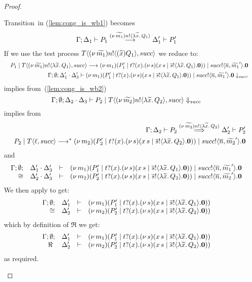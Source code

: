 \begin{proof}
\begin{enumerate}
\begin{enumerate}[i.]
						\noi Transition~in (\ref{lem:cong_is_wb1}) becomes
						\begin{eqnarray}
							\Gamma; \Delta_1 \vdash P_1 \stackrel{(\nu\, \widetilde{m_1}) n ! \langle \lambda \widetilde{x}.\,Q_1 \rangle}{\longrightarrow} \Delta_1' \vdash P_1'
							\label{lem:cong_is_wb3}
						\end{eqnarray}
						\noi If we use the test process $T\langle (\nu\, \widetilde{m_1}) n ! \langle (\widetilde{x}) Q_1 \rangle, succ \rangle$ we reduce to:%
						\begin{eqnarray*}
							&& P_1 \;|\; T\langle (\nu\, \widetilde{m_1}) n ! \langle \lambda \widetilde{x}.\,Q_1 \rangle, succ \rangle
							\longrightarrow
							(\nu\, m_1)(P_1' \;|\; t ? (x) . (\nu\, s)(x\, {s} \;|\; \overline{s} ! \langle \lambda \widetilde{x}.\,Q_1 \rangle . \mathbf{0})) \;|\; succ ! \langle \overline{n}, \widetilde{m_1}' \rangle . \mathbf{0} \\
							&& \Gamma; \emptyset; \Delta_1' \cdot \Delta_3' \vdash (\nu\, m_1)(P_1' \;|\; t ? (x) . (\nu\, s)(x\, {s} \;|\; \overline{s} ! \langle \lambda \widetilde{x}.\,Q_1 \rangle . \mathbf{0})) \;|\; succ ! \langle \overline{n}, \widetilde{m_1}' \rangle . \mathbf{0} \downarrow_{succ}
						\end{eqnarray*}
						\noi implies from~(\ref{lem:cong_is_wb2})
						\[
							\Gamma; \emptyset; \Delta_2 \cdot \Delta_3 \vdash P_2 \;|\; T\langle (\nu\, \widetilde{m_2}) n ! \langle \lambda \widetilde{x}.\,Q_2 \rangle, succ \rangle \Downarrow_{succ}
						\]
						\noi implies from 
						\begin{eqnarray}
							&& \Gamma; \Delta_2 \vdash P_2 \stackrel{(\nu\, \widetilde{m_2}) n ! \langle \lambda \widetilde{x}.\,Q_2 \rangle}{\Longrightarrow} \Delta_2' \vdash P_2'
							\label{lem:cong_is_wb4}\\
							&& P_2 \;|\; T \langle \ell, succ \rangle \longrightarrow^{*} (\nu\, m_2)(P_2' \;|\; t ? (x) . (\nu\, s)(x\, {s} \;|\; \overline{s} ! \langle \lambda \widetilde{x}.\,Q_2 \rangle . \mathbf{0})) \;|\; succ ! \langle \overline{n}, \widetilde{m_2}' \rangle . \mathbf{0} \nonumber
						\end{eqnarray}
						\noi and
						\[
							\begin{array}{rcll} \Gamma; \emptyset; &\Delta_1' \cdot \Delta_3'& \vdash& (\nu\, m_1)(P_1' \;|\; t ? (x) . (\nu\, s)(x\, {s} \;|\; \overline{s} ! \langle \lambda \widetilde{x}.\,Q_1 \rangle . \mathbf{0})) \;|\; succ ! \langle \overline{n}, \widetilde{m_1}' \rangle . \mathbf{0}\\ \cong &\Delta_2' \cdot \Delta_3'& \vdash &  (\nu\, m_2)(P_2' \;|\; t ? (x) . (\nu\, s)(x\, {s} \;|\; \overline{s} ! \langle \lambda \widetilde{x}.\,Q_2 \rangle . \mathbf{0})) \;|\; succ ! \langle \overline{n}, \widetilde{m_2}' \rangle . \mathbf{0} \end{array}
						\]
						\noi We then apply  to get:
						\[
							\begin{array}{rcll} \Gamma; \emptyset; &\Delta_1'& \vdash& (\nu\, m_1)(P_1' \;|\; t ? (x) . (\nu\, s)(x\, {s} \;|\; \overline{s} ! \langle \lambda \widetilde{x}.\,Q_1 \rangle . \mathbf{0}))\\ \cong &\Delta_2'& \vdash &  (\nu\, m_2)(P_2' \;|\; t ? (x) . (\nu\, s)(x\, {s} \;|\; \overline{s} ! \langle \lambda \widetilde{x}.\,Q_2 \rangle . \mathbf{0})) \end{array}
						\]
						\noi which by definition of $\Re$ we get:
						\[
							\begin{array}{rcll} \Gamma; \emptyset; &\Delta_1'& \vdash& (\nu\, m_1)(P_1' \;|\; t ? (x) . (\nu\, s)(x\, {s} \;|\; \overline{s} ! \langle \lambda \widetilde{x}.\,Q_1 \rangle . \mathbf{0}))\\ \ \Re\  &\Delta_2'& \vdash &  (\nu\, m_2)(P_2' \;|\; t ? (x) . (\nu\, s)(x\, {s} \;|\; \overline{s} ! \langle \lambda \widetilde{x}.\,Q_2 \rangle . \mathbf{0})) \end{array}
						\]
						\noi as required.


\end{enumerate}
\end{enumerate}
\end{proof}
